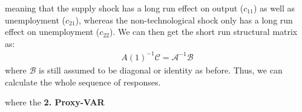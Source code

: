 \documentclass[a4paper, 12pt]{article}
\begin{document}
meaning that the supply shock has a long run effect on output ($c_{11}$) as well as unemployment ($c_{21}$), whereas the non-technological shock only has a long run effect on unemployment ($c_{22}$).
We can then get the short run structural matrix as:
\begin{equation}
\begin{aligned}
A(1)^{-1}\mathcal{C}=\mathcal{A}^{-1}\mathcal{B}\nonumber
\end{aligned}
\end{equation}
where $\mathcal{B}$ is still assumed to be diagonal or identity as before. Thus, we can calculate the whole sequence of responses.
\begin{center}
where the 
\textbf{2. Proxy-VAR}
\end{center}
\end{document}
